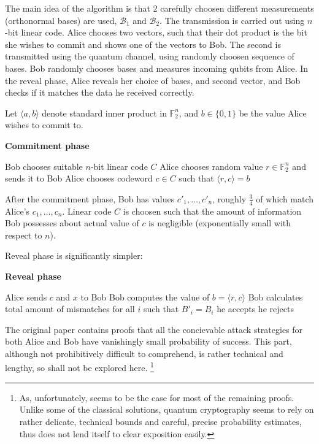 \documentclass[10pt]{article}
\begin{document}
The main idea of the algorithm is that 2 carefully choosen different measurements (orthonormal bases) 
are used, \(\mathcal{B}_1\) and \(\mathcal{B}_2\). The transmission is carried out using \(n\)-bit 
linear code. Alice chooses two vectors, such that their dot product is the bit she wishes to commit and
shows one of the vectors to Bob. The second is transmitted using the quantum channel, using randomly
choosen sequence of bases. Bob randomly chooses bases and measures incoming qubits from Alice. In the
reveal phase, Alice reveals her choice of bases, and second vector, and Bob checks if it matches
the data he received correctly.


Let \(\langle a,b\rangle\) denote standard inner product in \(\mathbb{F}_2^n\), and \(b\in\{0,1\}\) 
be the value Alice wishes to commit to.


\NoCaptionOfAlgo
\begin{algorithm}[H]
\caption{\textbf{Commitment phase}}
Bob chooses suitable \(n\)-bit linear code \(C\) \;
Alice chooses random value \(r\in\mathbb{F}_2^n\) and sends it to Bob \;
Alice chooses codeword \(c\in C\) such that \(\langle r,c\rangle = b\) \;
\end{algorithm}

After the commitment phase, Bob has values \(c'_1,\ldots,c'_n\), roughly \(\frac{3}{4}\) of 
which match Alice's \(c_1,\ldots,c_n\). Linear code \(C\) is choosen such that the amount of
information Bob possesses about actual value of \(c\) is negligible (exponentially small with
respect to \(n\)).

Reveal phase is significantly simpler:

\NoCaptionOfAlgo
\begin{algorithm}[H]
\caption{\textbf{Reveal phase}}
Alice sends \(c\) and \(x\) to Bob \;
Bob computes the value of \(b=\langle r,c\rangle\) \;
Bob calculates total amount of mismatches for all \(i\) such that \(B'_i=B_i\) \;
 {
  he accepts
}{
  he rejects
}
\end{algorithm}

The original paper contains proofs that all the concievable attack strategies for both Alice
and Bob have vanishingly small probability of success. This part, although not prohibitively
difficult to comprehend, is rather technical and lengthy, so shall not be explored here.
\footnote{As, unfortunately, seems to be the case for most of the remaining proofs. Unlike
some of the classical solutions, quantum cryptography seems to rely on rather delicate, technical
bounds and careful, precise probability estimates, thus does not lend itself to clear exposition
easily.}
\end{document}
